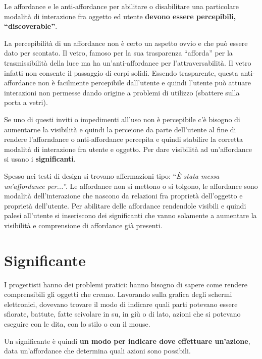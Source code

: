 Le affordance e le anti-affordance per abilitare o disabilitare una particolare modalità di interazione fra oggetto ed utente \textbf{devono essere percepibili, ``discoverable''}.

La percepibilità di un affordance non è certo un aspetto ovvio e che può essere dato per scontato. Il vetro, famoso per la sua trasparenza ``afforda'' per la trasmissibilità della luce ma ha un'anti-affordance per l'attraversabilità. Il vetro infatti non consente il passaggio di corpi solidi. Essendo trasparente, questa anti-affordance non è facilmente percepibile dall'utente e quindi l'utente può attuare interazioni non permesse dando origine a problemi di utilizzo (sbattere sulla porta a vetri).

Se uno di questi inviti o impedimenti all'uso non è percepibile c'è bisogno di aumentarne la visibilità e quindi la perceione da parte dell'utente al fine di rendere l'afforndance o anti-affordance percepita e quindi stabilire la corretta modalità di interazione fra utente e oggetto. Per dare visibilità ad un'affordance si usano i \textbf{significanti}.

Spesso nei testi di design si trovano affermazioni tipo: ``\textit{È stata messa un'affordance per...}''. Le affordance non si mettono o si tolgono, le affordance sono modalità dell'interazione che nascono da relazioni fra proprietà dell'oggetto e proprietà dell'utente. Per abilitare delle affordance rendendole visibili e quindi palesi all'utente si inseriscono dei significanti che vanno solamente a aumentare la visibilità e comprensione di affordance già presenti.

\section{Significante}
I progettisti hanno dei problemi pratici: hanno bisogno di sapere come rendere comprensibili gli oggetti che creano. Lavorando sulla grafica degli schermi elettronici, dovevano trovare il modo di indicare quali parti potevano essere sfiorate, battute, fatte scivolare in su, in giù o di lato, azioni che si potevano eseguire con le dita, con lo stilo o con il mouse.

Un significante è quindi \textbf{un modo per indicare dove effettuare un'azione}, data un'affordance che determina quali azioni sono possibili.

